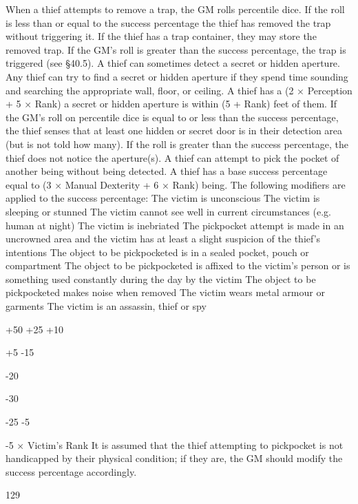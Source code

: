 \documentclass[a4paper]{article}
\begin{document}
\begin{multicols}{3}
When a thief attempts to remove a trap, the GM
rolls percentile dice. If the roll is less than or equal
to the success percentage the thief has removed the
trap without triggering it. If the thief has a trap
container, they may store the removed trap. If the
GM’s roll is greater than the success percentage,
the trap is triggered (see §40.5).
A thief can sometimes detect a secret or hidden
aperture.
Any thief can try to find a secret or hidden aperture
if they spend time sounding and searching the
appropriate wall, floor, or ceiling. A thief has a (2
× Perception + 5 × Rank)%
a secret or hidden aperture is within (5 + Rank) feet
of them.
If the GM’s roll on percentile dice is equal to or
less than the success percentage, the thief senses
that at least one hidden or secret door is in their
detection area (but is not told how many). If the
roll is greater than the success percentage, the thief
does not notice the aperture(s).
A thief can attempt to pick the pocket of another being without being detected.
A thief has a base success percentage equal to (3 ×
Manual Dexterity + 6 × Rank)%
being. The following modifiers are applied to the
success percentage:
The victim is unconscious
The victim is sleeping or stunned
The victim cannot see well in current circumstances (e.g. human at
night)
The victim is inebriated
The pickpocket attempt is made in
an uncrowned area and the victim
has at least a slight suspicion of the
thief’s intentions
The object to be pickpocketed is in a
sealed pocket, pouch or compartment
The object to be pickpocketed is
affixed to the victim’s person or is
something used constantly during
the day by the victim
The object to be pickpocketed
makes noise when removed
The victim wears metal armour or
garments
The victim is an assassin, thief or
spy

+50%
+25%
+10%

+5%
-15%

-20%

-30%

-25%
-5%

-5 × Victim’s
Rank%
It is assumed that the thief attempting to pickpocket is not handicapped by their physical condition; if they are, the GM should modify the success
percentage accordingly.

129


\end{multicols}
\end{document}
